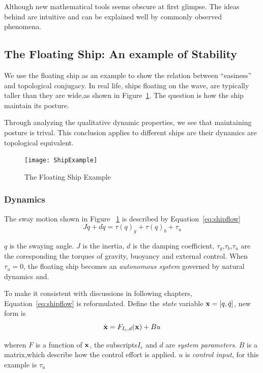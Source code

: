 Although new mathematical tools seems obscure at first glimpse.
The ideas behind are intuitive and can be explained well by commonly observed phenomena.



\subsection{The Floating Ship: An example of Stability}
We use the floating ship as an example to show the relation between ``easiness'' and topological conjugacy.
In real life, ships floating on the wave, are typically taller than they are wide,as shown in Figure~\ref{fig:ShipFloating}.
The  question is how the ship maintain its posture.

Through analyzing the qualitative dynamic properties, we see that maintaining posture is trival.
This conclusion applies to different ships are their dynamics are topological equivalent.


\begin{figure}[!htbp]
  \begin{center}
    \texttt{[image: ShipExample]}
    \caption{The Floating Ship Example}
    \label{fig:ShipFloating}
  \end{center}
\end{figure}

\subsubsection*{Dynamics}
The sway motion shown in Figure ~\ref{fig:ShipFloating} is described by Equation~\ref{eq:shipflow}
\begin{equation}
\label{eq:shipflow}
J\ddot{q}+d\dot{q}=\tau(q)_{g}+\tau(q)_{b}+\tau_{u}
\end{equation}

$q$ is the swaying angle.
$J$ is the inertia,  
$d$ is the damping coefficient,
$\tau_{g}$,$\tau_{b}$,$\tau_{u}$ are the coresponding the torques of gravity, buoyancy and external control.
When $\tau_{u}=0$,  the floating ship  becomes an \emph{autonomous system} governed by natural dynamics and.

To make it consistent with discussions in following chapters, Equation~\ref{eq:shipflow} is reformulated.
Define the \emph{state} variable $\mathbf{x}=[q,\dot{q}]$, new form is
\[
\dot{\mathbf{x}}=F_{I_e,d}(\mathbf{x})+Bu
\]

wheren 
$F$ is a function of $\mathbf{x}$, the subscripts$I_e$ and $d$ are \emph{system parameters}.
$B$ is a matrix,which describe how the control effort is applied.
$u$ is \emph{control input}, for this example is $\tau_{u}$



